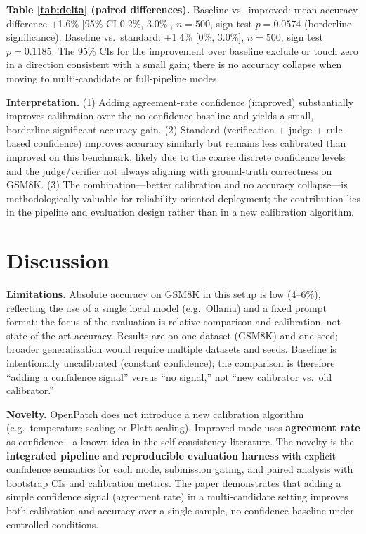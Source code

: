 \documentclass[10pt]{article}
\begin{document}
\textbf{Table \ref{tab:delta} (paired differences).} Baseline vs.\ improved: mean accuracy difference +1.6\% [95\% CI 0.2\%, 3.0\%], $n = 500$, sign test $p = 0.0574$ (borderline significance). Baseline vs.\ standard: +1.4\% [0\%, 3.0\%], $n = 500$, sign test $p = 0.1185$. The 95\% CIs for the improvement over baseline exclude or touch zero in a direction consistent with a small gain; there is no accuracy collapse when moving to multi-candidate or full-pipeline modes.

\textbf{Interpretation.} (1) Adding agreement-rate confidence (improved) substantially improves calibration over the no-confidence baseline and yields a small, borderline-significant accuracy gain. (2) Standard (verification + judge + rule-based confidence) improves accuracy similarly but remains less calibrated than improved on this benchmark, likely due to the coarse discrete confidence levels and the judge/verifier not always aligning with ground-truth correctness on GSM8K. (3) The combination---better calibration and no accuracy collapse---is methodologically valuable for reliability-oriented deployment; the contribution lies in the pipeline and evaluation design rather than in a new calibration algorithm.

\section{Discussion}
\label{sec:discussion}
\textbf{Limitations.} Absolute accuracy on GSM8K in this setup is low (4--6\%), reflecting the use of a single local model (e.g.\ Ollama) and a fixed prompt format; the focus of the evaluation is relative comparison and calibration, not state-of-the-art accuracy. Results are on one dataset (GSM8K) and one seed; broader generalization would require multiple datasets and seeds. Baseline is intentionally uncalibrated (constant confidence); the comparison is therefore ``adding a confidence signal'' versus ``no signal,'' not ``new calibrator vs.\ old calibrator.''

\textbf{Novelty.} OpenPatch does not introduce a new calibration algorithm (e.g.\ temperature scaling or Platt scaling). Improved mode uses \textbf{agreement rate} as confidence---a known idea in the self-consistency literature. The novelty is the \textbf{integrated pipeline} and \textbf{reproducible evaluation harness} with explicit confidence semantics for each mode, submission gating, and paired analysis with bootstrap CIs and calibration metrics. The paper demonstrates that adding a simple confidence signal (agreement rate) in a multi-candidate setting improves both calibration and accuracy over a single-sample, no-confidence baseline under controlled conditions.
\end{document}
